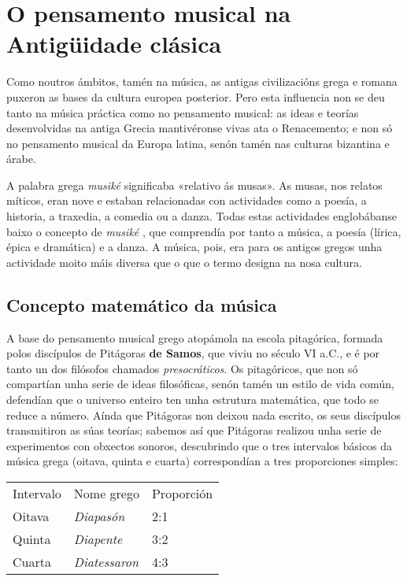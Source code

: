 

\section{O pensamento musical na Antigüidade
clásica}\label{o-pensamento-musical--na-antiguxfcidade-cluxe1sica}

Como noutros ámbitos, tamén na música, as antigas civilizacións grega e
romana puxeron as bases da cultura europea posterior. Pero esta
influencia non se deu tanto na música práctica como no pensamento
musical: as ideas e teorías desenvolvidas na antiga Grecia mantivéronse
vivas ata o Renacemento; e non só no pensamento musical da Europa
latina, senón tamén nas culturas bizantina e árabe.

A palabra grega \emph{musiké} significaba «relativo ás musas».
As musas, nos relatos míticos, eran nove e estaban relacionadas con
actividades como a poesía, a historia, a traxedia, a comedia ou a danza.
Todas estas actividades englobábanse baixo o concepto de \emph{musiké} ,
que comprendía por tanto a música, a poesía (lírica, épica e dramática)
e a danza. A música, pois, era para os antigos gregos unha actividade
moito máis diversa que o que o termo designa na nosa cultura.


\subsection*{Concepto matemático da
música}\label{concepto-matemuxe1tico-da-muxfasica}

A base do pensamento musical grego atopámola na escola pitagórica,
formada polos discípulos de Pitágoras \textbf{de Samos}, que viviu no
século VI a.C., e é por tanto un dos filósofos chamados
\emph{presocráticos}. Os pitagóricos, que non só compartían unha serie
de ideas filosóficas, senón tamén un estilo de vida común, defendían que
o universo enteiro ten unha estrutura matemática, que todo se reduce a
número. Aínda que Pitágoras non deixou nada escrito, os seus discípulos
transmitiron as súas teorías; sabemos así que Pitágoras realizou unha
serie de experimentos con obxectos sonoros, descubrindo que o tres
intervalos básicos da música grega (oitava, quinta e cuarta)
correspondían a tres proporciones simples:

\begin{center}
\begin{tabular}{lll}
Intervalo & Nome grego & Proporción \\
Oitava & \emph{Diapasón} & 2:1 \\
Quinta & \emph{Diapente} & 3:2 \\
Cuarta & \emph{Diatessaron} & 4:3 \\
\end{tabular}
\end{center}


